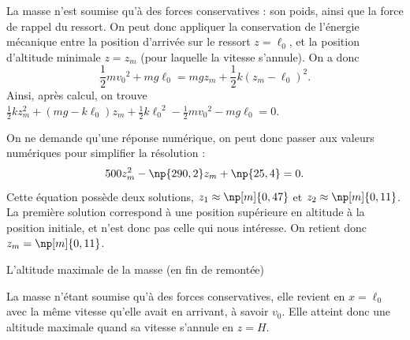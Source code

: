 \begin{corrige}
La masse n'est soumise qu'à des forces conservatives : son poids, ainsi que la force de rappel du ressort. On peut donc appliquer la conservation de l'énergie mécanique entre la position d'arrivée sur le ressort $z=\ell_0$, et la position d'altitude minimale $z=z_m$ (pour laquelle la vitesse s'annule). On a donc
\[
\frac{1}{2}m{v_0}^2+mg\ell_0 = mgz_m+\frac{1}{2}k(z_m-\ell_0)^2.
\]
Ainsi, après calcul, on trouve $\frac{1}{2}kz_m^2+(mg-k\ell_0)z_m+\frac{1}{2}k{\ell_0}^2-\frac{1}{2}m{v_0}^2-mg\ell_0=0$.

On ne demande qu'une réponse numérique, on peut donc passer aux valeurs numériques pour simplifier la résolution :
\[
500 z_m^2-\np{290,2} z_m+\np{25,4} = 0.
\]
Cette équation possède deux solutions, $z_1\approx\np[m]{0,47}$ et $z_2\approx\np[m]{0,11}$. La première solution correspond à une position supérieure en altitude à la position initiale, et n'est donc pas celle qui nous intéresse. On retient donc
$z_m = \np[m]{0,11}$.
\end{corrige}




\begin{enonce}
L'altitude maximale de la masse (en fin de remontée)
\end{enonce}


\begin{corrige}
La masse n'étant soumise qu'à des forces conservatives, elle revient en $x=\ell_0$ avec la même vitesse qu'elle avait en arrivant, à savoir $v_0$. Elle atteint donc une altitude maximale quand sa vitesse s'annule en $z=H$.
\end{corrige}


\finEntrainement








